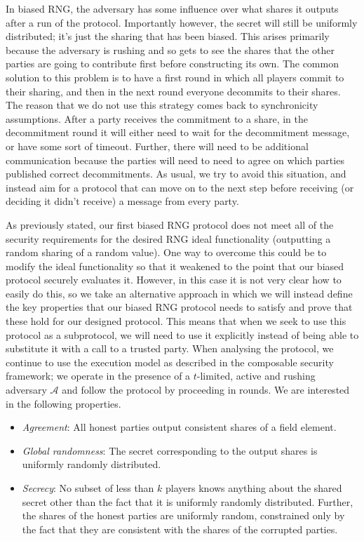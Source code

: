 \documentclass{article}
\theoremstyle{remark}
\begin{document}
In biased RNG, the adversary has some influence over what shares it outputs
after a run of the protocol. Importantly however, the secret will still be
uniformly distributed; it's just the sharing that has been biased. This arises
primarily because the adversary is rushing and so gets to see the shares that
the other parties are going to contribute first before constructing its own.
The common solution to this problem is to have a first round in which all
players commit to their sharing, and then in the next round everyone decommits
to their shares. The reason that we do not use this strategy comes back to
synchronicity assumptions. After a party receives the commitment to a share, in
the decommitment round it will either need to wait for the decommitment
message, or have some sort of timeout. Further, there will need to be
additional communication because the parties will need to need to agree on
which parties published correct decommitments. As usual, we try to avoid this
situation, and instead aim for a protocol that can move on to the next step
before receiving (or deciding it didn't receive) a message from every party.

As previously stated, our first biased RNG protocol does not meet all of the
security requirements for the desired RNG ideal functionality (outputting a
random sharing of a random value). One way to overcome this could be to modify
the ideal functionality so that it weakened to the point that our biased
protocol securely evaluates it. However, in this case it is not very clear how
to easily do this, so we take an alternative approach in which we will instead
define the key properties that our biased RNG protocol needs to satisfy and
prove that these hold for our designed protocol. This means that when we seek
to use this protocol as a subprotocol, we will need to use it explicitly
instead of being able to substitute it with a call to a trusted party. When
analysing the protocol, we continue to use the execution model as described in
the composable security framework; we operate in the presence of a $t$-limited,
active and rushing adversary $\mathcal{A}$ and follow the protocol by
proceeding in rounds. We are interested in the following properties.

\begin{itemize}
	\item \textit{Agreement}: All honest parties output consistent shares of a
		field element.

	\item \textit{Global randomness}: The secret corresponding to the output
		shares is uniformly randomly distributed.

	\item \textit{Secrecy}: No subset of less than $k$ players knows anything
		about the shared secret other than the fact that it is uniformly
		randomly distributed. Further, the shares of the honest parties are
		uniformly random, constrained only by the fact that they are consistent
		with the shares of the corrupted parties.
\end{itemize}
\end{document}

